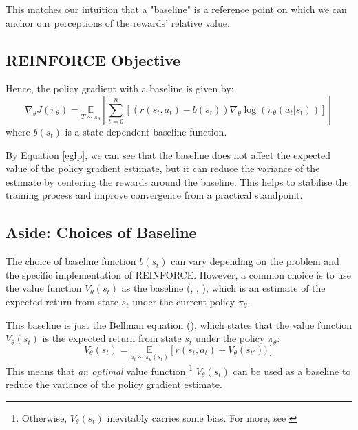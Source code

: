 \documentclass{article} %
\begin{document}
This matches our intuition that a "baseline" is a reference point on which we can anchor
our perceptions of the rewards' relative value. 

\subsection{REINFORCE Objective}

Hence, the policy gradient with a baseline is given by:
\begin{equation} \label{policy_gradient_baseline}
    \nabla_\theta J(\pi_\theta) = \underset{T \sim \pi_\theta}{\mathbb{E}} \left[\sum_{t=0}^{n} \left[ (r(s_t, a_t) - b(s_t)) \nabla_\theta \log(\pi_\theta(a_t | s_t)) \right]\right]
\end{equation}
where $b(s_t)$ is a state-dependent baseline function.

By Equation \eqref{eglp}, we can see that the baseline does not affect the expected value of the policy gradient estimate,
but it can reduce the variance of the estimate by centering the rewards around the baseline.
This helps to stabilise the training process and improve convergence from a practical standpoint.

\subsection{Aside: Choices of Baseline}
The choice of baseline function $b(s_t)$ can vary depending on the problem and the specific implementation of REINFORCE.
However, a common choice is to use the value function $V_\theta(s_t)$ as the baseline (\cite{SpinningUp-2018}, \cite{Sutton-and-Barto-1998}, \cite{Weng-2018}), which is an estimate of the expected return from state $s_t$ under the current policy $\pi_\theta$.

This baseline is just the Bellman equation (\cite{Sutton-and-Barto-1998}), which states that the value function $V_\theta(s_t)$ is the expected return from state $s_t$ under the policy $\pi_\theta$:
\begin{equation} \label{value_function}
    V_\theta(s_t) = \underset{a_t \sim \pi_\theta(s_t)}{\mathbb{E}} \left[ r(s_t, a_t) + V_\theta(s_{t'})) \right]
\end{equation}
This means that \textit{an optimal} value function \footnote{Otherwise, $V_\theta(s_t)$ inevitably carries some bias. For more, see \cite{Schulman-et-al-2016}} 
$V_\theta(s_t)$ can be used as a baseline to reduce the variance of the policy gradient estimate.
\end{document}
